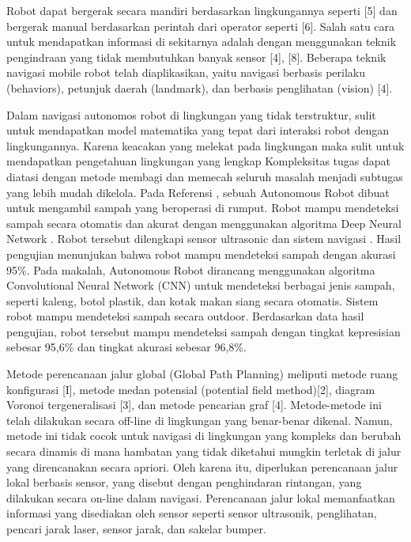  Robot dapat bergerak secara mandiri berdasarkan lingkungannya seperti [5] dan bergerak manual berdasarkan perintah dari operator seperti [6]. 
 Salah satu cara untuk mendapatkan informasi di sekitarnya adalah dengan menggunakan teknik pengindraan yang tidak membutuhkan banyak sensor [4], [8].
 Beberapa teknik navigasi mobile robot telah diaplikasikan, yaitu navigasi berbasis perilaku (behaviors), petunjuk daerah (landmark), dan berbasis penglihatan (vision) [4]. 
 
 
 Dalam navigasi autonomos robot di lingkungan yang tidak terstruktur, sulit untuk mendapatkan model matematika yang tepat dari interaksi robot dengan lingkungannya. Karena keacakan yang melekat pada lingkungan  maka sulit untuk mendapatkan pengetahuan lingkungan yang lengkap \cite{Mustafa2019} Kompleksitas tugas dapat diatasi dengan metode membagi dan memecah seluruh masalah menjadi subtugas yang lebih mudah dikelola. Pada Referensi \cite{Bai2018}, sebuah Autonomous Robot dibuat untuk mengambil sampah yang beroperasi di rumput. Robot mampu mendeteksi sampah secara otomatis dan akurat dengan menggunakan algoritma Deep Neural Network \cite{Kong2009}. Robot tersebut dilengkapi sensor ultrasonic\cite{Michael2008} dan sistem navigasi \cite{Wang2008}. Hasil pengujian menunjukan bahwa robot mampu mendeteksi sampah dengan akurasi 95\%. Pada makalah\cite{Arai2019}, Autonomous Robot dirancang menggunakan algoritma Convolutional Neural Network (CNN) untuk mendeteksi berbagai jenis sampah, seperti kaleng, botol plastik, dan kotak makan siang secara otomatis. Sistem robot mampu mendeteksi sampah secara outdoor. Berdasarkan data hasil pengujian\cite{Arai2019}, robot tersebut mampu mendeteksi sampah dengan tingkat kepresisian sebesar 95,6\% dan tingkat akurasi sebesar 96,8\%.
 
 Metode perencanaan jalur global (Global Path Planning) meliputi metode ruang konfigurasi [I], metode medan potensial (potential field method)[2], diagram Voronoi tergeneralisasi [3], dan metode pencarian graf [4]. Metode-metode ini telah dilakukan secara off-line di lingkungan yang benar-benar dikenal. Namun, metode ini tidak cocok untuk navigasi di lingkungan yang kompleks dan berubah secara dinamis di mana hambatan yang tidak diketahui mungkin terletak di jalur yang direncanakan secara apriori. Oleh karena itu, diperlukan perencanaan jalur lokal berbasis sensor, yang disebut dengan penghindaran rintangan, yang dilakukan secara on-line dalam navigasi. Perencanaan jalur lokal memanfaatkan informasi yang disediakan oleh sensor seperti sensor ultrasonik, penglihatan, pencari jarak laser, sensor jarak, dan sakelar bumper.


